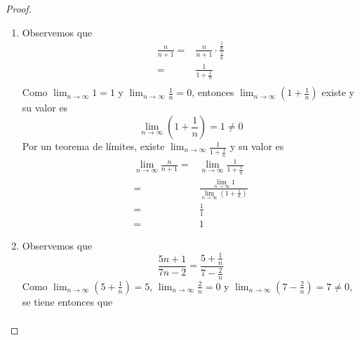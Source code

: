 \documentclass[12pt]{article}
\begin{document}
\begin{enumerate}
        \begin{proof}
            \begin{enumerate}
                \item Observemos que
                \begin{equation*}
                    \begin{split}
                        \frac{n}{n+1}=&\frac{n}{n+1}\cdot\frac{\frac{1}{n}}{\frac{1}{n}}\\
                        =&\frac{1}{1+\frac{1}{n}}\\
                    \end{split}
                \end{equation*}
                Como $\lim_{n\rightarrow\infty}1=1$ y $\lim_{n\rightarrow\infty}\frac{1}{n}=0$, entonces $\lim_{n\rightarrow\infty}\left(1+\frac{1}{n}\right)$ existe y su valor es
                \begin{equation*}
                    \lim_{n\rightarrow\infty}\left(1+\frac{1}{n}\right)=1\neq0
                \end{equation*}
                Por un teorema de límites, existe $\lim_{n\rightarrow\infty}\frac{1}{1+\frac{1}{n}}$ y su valor es
                \begin{equation*}
                    \begin{split}
                        \lim_{n\rightarrow\infty}\frac{n}{n+1}=&\lim_{n\rightarrow\infty}\frac{1}{1+\frac{1}{n}}\\
                        =&\frac{\lim_{n\rightarrow\infty}1}{\lim_{n\rightarrow\infty}\left(1+\frac{1}{n}\right)}\\
                        =&\frac{1}{1}\\
                        =&1
                    \end{split}
                \end{equation*}
                \item Observemos que
                \begin{equation*}
                    \frac{5n+1}{7n-2}=\frac{5+\frac{1}{n}}{7-\frac{2}{n}}
                \end{equation*}
                Como $\lim_{n\rightarrow\infty}\left(5+\frac{1}{n}\right)=5$, $\lim_{n\rightarrow\infty}\frac{2}{n}=0$ y $\lim_{n\rightarrow\infty}\left(7-\frac{2}{n}\right)=7\neq0$, se tiene entonces que
                \begin{equation*}
                    \begin{split}

\end{split}
\end{equation*}
\end{enumerate}
\end{proof}
\end{enumerate}
\end{document}
